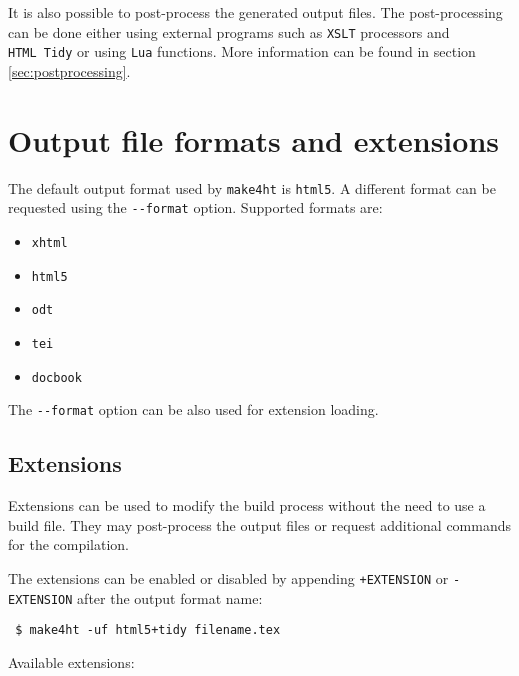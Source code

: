 It is also possible to post-process the generated output files. The
post-processing can be done either using external programs such as
\texttt{XSLT} processors and \texttt{HTML\ Tidy} or using \texttt{Lua}
functions. More information can be found in section
\ref{sec:postprocessing}.

\hypertarget{output-file-formats-and-extensions}{%
\section{Output file formats and
extensions}\label{output-file-formats-and-extensions}}

\label{sec:output}

The default output format used by \texttt{make4ht} is \texttt{html5}. A
different format can be requested using the \texttt{-\/-format} option.
Supported formats are:

\begin{itemize}
\tightlist
\item
  \texttt{xhtml}
\item
  \texttt{html5}
\item
  \texttt{odt}
\item
  \texttt{tei}
\item
  \texttt{docbook}
\end{itemize}

The \texttt{-\/-format} option can be also used for extension loading.

\hypertarget{extensions}{%
\subsection{Extensions}\label{extensions}}

Extensions can be used to modify the build process without the need to
use a build file. They may post-process the output files or request
additional commands for the compilation.

The extensions can be enabled or disabled by appending
\texttt{+EXTENSION} or \texttt{-EXTENSION} after the output format name:

\begin{verbatim}
 $ make4ht -uf html5+tidy filename.tex
\end{verbatim}

Available extensions:

